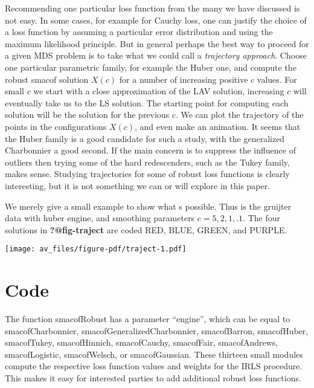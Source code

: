 \documentclass[
  12pt,
  letterpaper,
  DIV=11,
  numbers=noendperiod]{scrartcl}
\newcommand{\sectionbreak}{\pagebreak}
\theoremstyle{definition}
\theoremstyle{definition}
\theoremstyle{plain}
\theoremstyle{plain}
\theoremstyle{plain}
\theoremstyle{remark}
\begin{document}
Recommending one particular loss function from the many we have
discussed is not easy. In some cases, for example for Cauchy loss, one
can justify the choice of a loss function by assuming a particular error
distribution and using the maximum likelihood principle. But in general
perhaps the best way to proceed for a given MDS problem is to take what
we could call a \emph{trajectory approach}. Choose one particular
parametric family, for example the Huber one, and compute the robust
smacof solution \(X(c)\) for a number of increasing positive \(c\)
values. For small \(c\) we start with a close approximation of the LAV
solution, increasing \(c\) will eventually take us to the LS solution.
The starting point for computing each solution will be the solution for
the previous \(c\). We can plot the trajectory of the points in the
configurations \(X(c)\), and even make an animation. It seems that the
Huber family is a good candidate for such a study, with the generalized
Charbonnier a good second. If the main concern is to suppress the
influence of outliers then trying some of the hard redescenders, such as
the Tukey family, makes sense. Studying trajectories for some of robust
loss functions is clearly interesting, but it is not something we can or
will explore in this paper.

We merely give a small example to show what s possible. Thus is the
gruijter data with huber engine, and smoothing parameters
\(c=5,2,1,.1\). The four solutions in \textbf{?@fig-traject} are coded
RED, BLUE, GREEN, and PURPLE.

\begin{center}
\texttt{[image: av\_files/figure-pdf/traject-1.pdf]}
\end{center}

\sectionbreak

\section{Code}\label{code}

The function smacofRobust has a parameter ``engine'', which can be equal
to smacofCharbonnier, smacofGeneralizedCharbonnier, smacofBarron,
smacofHuber, smacofTukey, smacofHinnich, smacofCauchy, smacofFair,
smacofAndrews, smacofLogistic, smacofWelsch, or smacofGaussian. These
thirteen small modules compute the respective loss function values and
weights for the IRLS procedure. This makes it easy for interested
parties to add additional robust loss functions.
\end{document}
